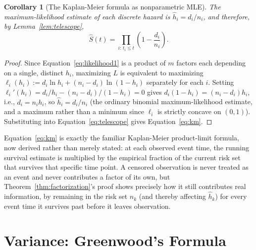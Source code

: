 \documentclass[11pt]{article}
\newtheorem{corollary}{Corollary}
\theoremstyle{remark}
\theoremstyle{definition}
\begin{document}
\begin{corollary}[The Kaplan-Meier formula as nonparametric MLE]
\label{cor:km}
The maximum-likelihood estimate of each discrete hazard is $\hat h_i = d_i/n_i$, and therefore, by Lemma~\ref{lem:telescope},
\begin{equation}
\hat S(t) = \prod_{i:\,t_i\le t}\left(1-\frac{d_i}{n_i}\right).
\label{eq:km}
\end{equation}
\end{corollary}
\begin{proof}
Since Equation~\eqref{eq:likelihood1} is a product of $m$ factors each depending on a single, distinct $h_i$, maximizing $L$ is equivalent to maximizing $\ell_i(h_i):=d_i\ln h_i+(n_i-d_i)\ln(1-h_i)$ separately for each $i$. Setting $\ell_i'(h_i)=d_i/h_i-(n_i-d_i)/(1-h_i)=0$ gives $d_i(1-h_i)=(n_i-d_i)h_i$, i.e., $d_i=n_ih_i$, so $\hat h_i=d_i/n_i$ (the ordinary binomial maximum-likelihood estimate, and a maximum rather than a minimum since $\ell_i$ is strictly concave on $(0,1)$). Substituting into Equation~\eqref{eq:telescope} gives Equation~\eqref{eq:km}.
\end{proof}

Equation~\eqref{eq:km} is exactly the familiar Kaplan-Meier product-limit formula, now derived rather than merely stated: at each observed event time, the running survival estimate is multiplied by the empirical fraction of the current risk set that survives that specific time point. A censored observation is never treated as an event and never contributes a factor of its own, but Theorem~\ref{thm:factorization}'s proof shows precisely how it still contributes real information, by remaining in the risk set $n_k$ (and thereby affecting $\hat h_k$) for every event time it survives past before it leaves observation.

\section{Variance: Greenwood's Formula}
\label{sec:variance}
\end{document}

